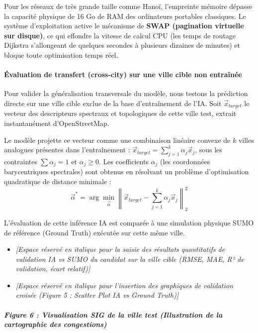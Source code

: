 \documentclass[10pt, a4paper]{article}
\providecommand{\tightlist}{}
\begin{document}
Pour les réseaux de très grande taille comme Hanoï, l'empreinte mémoire
dépasse la capacité physique de 16 Go de RAM des ordinateurs portables
classiques. Le système d'exploitation active le mécanisme de
\textbf{SWAP (pagination virtuelle sur disque)}, ce qui effondre la
vitesse de calcul CPU (les temps de routage Dijkstra s'allongeant de
quelques secondes à plusieurs dizaines de minutes) et bloque toute
optimisation temps réel.

\paragraph{Évaluation de transfert (cross-city) sur une ville cible non
entraînée}\label{uxe9valuation-de-transfert-cross-city-sur-une-ville-cible-non-entrauxeenuxe9e}

Pour valider la généralisation transversale du modèle, nous testons la
prédiction directe sur une ville cible exclue de la base d'entraînement
de l'IA. Soit \(\vec{x}_{target}\) le vecteur des descripteurs spectraux
et topologiques de cette ville test, extrait instantanément
d'OpenStreetMap.

Le modèle projette ce vecteur comme une combinaison linéaire convexe de
\(k\) villes analogues présentes dans l'entraînement :
\(\vec{x}_{target} = \sum_{j=1}^k \alpha_j \vec{x}_j\), sous les
contraintes \(\sum \alpha_j = 1\) et \(\alpha_j \ge 0\). Les
coefficients \(\alpha_j\) (les coordonnées barycentriques spectrales)
sont obtenus en résolvant un problème d'optimisation quadratique de
distance minimale :
\[\vec{\alpha}^* = \arg\min_{\vec{\alpha}} \left\| \vec{x}_{target} - \sum_{j=1}^k \alpha_j \vec{x}_j \right\|_2^2\]

L'évaluation de cette inférence IA est comparée à une simulation
physique SUMO de référence (Ground Truth) exécutée sur cette même ville.

\begin{itemize}
\tightlist
\item
  \emph{{[}Espace réservé en italique pour la saisie des résultats
  quantitatifs de validation IA vs SUMO du candidat sur la ville cible
  (RMSE, MAE, R² de validation, écart relatif){]}}
\item
  \emph{{[}Espace réservé en italique pour l'insertion des graphiques de
  validation croisée (Figure 5 : Scatter Plot IA vs Ground Truth){]}}
\end{itemize}

\subparagraph{Figure 6 : Visualisation SIG de la ville test
(Illustration de la cartographie des
congestions)}\label{figure-6-visualisation-sig-de-la-ville-test-illustration-de-la-cartographie-des-congestions}
\end{document}
